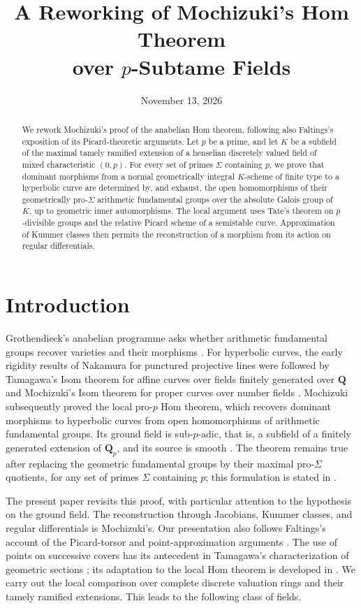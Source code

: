 \documentclass[11pt,a4paper]{article}
\title{A Reworking of Mochizuki's Hom Theorem\\over \texorpdfstring{$p$}{p}-Subtame Fields}
\author{}
\date{November 13, 2026}
\numberwithin{equation}{section}
\theoremstyle{plain}
\theoremstyle{definition}
\theoremstyle{remark}
\newcommand{\Qp}{\mathbf Q_p}
\renewcommand{\S}{\ensuremath{\mathsection}}
\begin{document}
\maketitle
\begin{abstract}
We rework Mochizuki's proof of the anabelian Hom theorem, following also
Faltings's exposition of its Picard-theoretic arguments.
Let $p$ be a prime, and let $K$ be a subfield of the maximal tamely ramified
extension of a henselian discretely valued field of mixed characteristic
$(0,p)$. For every set of primes $\Sigma$ containing $p$, we prove that
dominant morphisms from a normal geometrically integral $K$-scheme of finite
type to a hyperbolic curve are determined by, and exhaust, the open
homomorphisms of their geometrically pro-$\Sigma$ arithmetic fundamental
groups over the absolute Galois group of $K$, up to geometric inner
automorphisms. The local argument uses Tate's
theorem on $p$-divisible groups and the relative Picard scheme of a semistable
curve. Approximation of Kummer classes then permits the reconstruction of a
morphism from its action on regular differentials.
\end{abstract}

\section{Introduction}
\label{sec:intro}

Grothendieck's anabelian programme asks whether arithmetic fundamental
groups recover varieties and their morphisms \cite{Grothendieck1997}.
For hyperbolic curves, the early rigidity results of Nakamura for
punctured projective lines \cite{Nakamura1990} were followed by
Tamagawa's Isom theorem for affine curves over fields finitely generated
over $\mathbf Q$ \cite[Theorem~(0.3)]{Tamagawa1997} and Mochizuki's
Isom theorem for proper curves over number fields
\cite[Theorem~A]{Mochizuki1996}. Mochizuki subsequently proved the local
pro-$p$ Hom theorem, which recovers dominant morphisms to hyperbolic
curves from open homomorphisms of arithmetic fundamental groups. Its
ground field is sub-$p$-adic, that is, a subfield of a finitely generated
extension of $\Qp$, and its source is smooth
\cite[Theorem~A and Theorem~16.5]{Mochizuki1999}. The theorem remains true
after replacing the geometric fundamental groups by their maximal
pro-$\Sigma$ quotients, for any set of primes $\Sigma$ containing $p$;
this formulation is stated in \cite[Theorem~A and the subsequent remark,
p.~121]{Mochizuki2003}.

The present paper revisits this proof, with particular attention to the
hypothesis on the ground field. The reconstruction through Jacobians,
Kummer classes, and regular differentials is Mochizuki's. Our presentation
also follows Faltings's account of the Picard-torsor and point-approximation
arguments \cite[\S\S5--6]{Faltings1998}. The use of points on successive
covers has its antecedent in Tamagawa's characterization of geometric
sections \cite[Corollary~(2.10)]{Tamagawa1997}; its adaptation to the local
Hom theorem is developed in \cite[\S\S7--10]{Mochizuki1999}.
We carry out the local comparison over complete discrete valuation rings
and their tamely ramified extensions. This leads to the following class
of fields.
\end{document}

